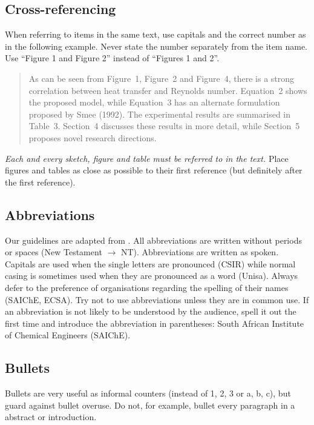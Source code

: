\documentclass[a5paper, 10pt]{article}
\begin{document}
\subsection{Cross-referencing}
When referring to items in the same text, use capitals and the
correct number as in the following example. 
Never state the number separately from the item name. 
Use ``Figure 1 and Figure 2'' instead of ``Figures 1 and 2''.

\begin{quote}
  As can be seen from Figure~1, Figure~2 and Figure~4, there is a strong
  correlation between heat transfer and Reynolds number.  Equation~2
  shows the proposed model, while Equation~3 has an alternate
  formulation proposed by Smee (1992).  The experimental results are
  summarised in Table~3.  Section~4 discusses these results in more
  detail, while Section~5 proposes novel research directions.
\end{quote}

\emph{Each and every sketch, figure and  table must be referred to in the text.} 
Place figures and tables as close as possible to their first reference (but definitely after the first reference).  


\subsection{Abbreviations}
\label{sec:abbreviations}
Our guidelines are adapted from \citet[17]{burger}.  All abbreviations
are written without periods or spaces (New Testament $\rightarrow$
NT).  Abbreviations are written as spoken. Capitals are used when the
single letters are pronounced (CSIR) while normal casing is sometimes used
when they are pronounced as a word (Unisa).  Always defer to the
preference of organisations regarding the spelling of their names
(SAIChE, ECSA).  Try not to use abbreviations unless they are in
common use.  If an abbreviation is not likely to be understood by the
audience, spell it out the first time and introduce the abbreviation
in parentheses: South African Institute of Chemical Engineers (SAIChE).

\subsection{Bullets}
\label{sec:bullets}
Bullets are very useful as informal counters (instead of 1, 2, 3 or a, b, c), but guard against bullet overuse.
Do not, for example, bullet every paragraph in a abstract or introduction.
\end{document}
